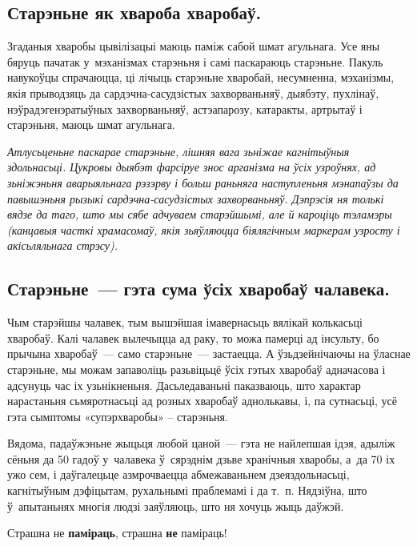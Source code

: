 \subsection*{Старэньне як хвароба хваробаў.}

Згаданыя хваробы цывілізацыі маюць паміж сабой шмат агульнага. Усе яны бяруць пачатак у~мэханізмах старэньня і самі паскараюць старэньне. Пакуль навукоўцы спрачаюцца, ці лічыць старэньне хваробай, несумненна, мэханізмы, якія прыводзяць да сардэчна-сасудзістых захворваньняў, дыябэту, пухлінаў, нэўрадэгенэратыўных захворваньняў, астэапарозу, катаракты, артрытаў і старэньня, маюць шмат агульнага.

\emph{Атлусьценьне паскарае старэньне, лішняя вага зьніжае кагнітыўныя здольнасьці. Цукровы дыябэт фарсіруе знос арганізма на ўсіх узроўнях, ад зьніжэньня аварыяльнага рэзэрву і больш раньняга наступленьня мэнапаўзы да павышэньня рызыкі сардэчна-сасудзістых захворваньняў. Дэпрэсія ня толькі вядзе да таго, што мы сябе адчуваем старэйшымі, але й кароціць тэламэры (канцавыя часткі храмасомаў, якія зьяўляюцца біялягічным маркерам узросту і акісьляльнага стрэсу).}

\subsection*{Старэньне~--- гэта сума ўсіх хваробаў чалавека.}

Чым старэйшы чалавек, тым вышэйшая імавернасьць вялікай колькасьці хваробаў. Калі чалавек вылечыцца ад раку, то можа памерці ад інсульту, бо прычына хваробаў~--- само старэньне~--- застаецца. А ўзьдзейнічаючы на ўласнае старэньне, мы можам запаволіць разьвіцьцё ўсіх гэтых хваробаў адначасова і адсунуць час іх узьнікненьня. Дасьледаваньні паказваюць, што характар нарастаньня сьмяротнасьці ад розных хваробаў аднолькавы, і, па сутнасьці, усё гэта сымптомы «супэрхваробы» -- старэньня. 


Вядома, падаўжэньне жыцьця любой цаной~--- гэта не найлепшая ідэя, адыліж сёньня да 50 гадоў у~чалавека ў~сярэднім дзьве хранічныя хваробы, а~да 70 іх ужо сем, і даўгалецьце азмрочваецца абмежаваньнем дзеяздольнасьці, кагнітыўным дэфіцытам, рухальнымі праблемамі і да т.~п. Нядзіўна, што ў~апытаньнях многія людзі заяўляюць, што ня хочуць жыць даўжэй. 

Страшна не \textbf{паміраць}, страшна \textbf{не} паміраць!

